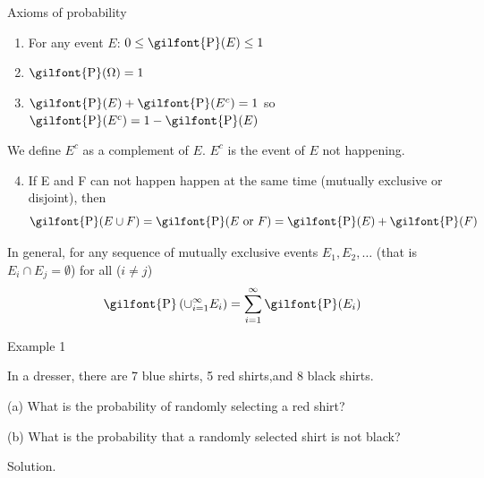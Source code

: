 \documentclass[
  ignorenonframetext,
]{beamer}
\providecommand{\tightlist}{%
  \setlength{\itemsep}{0pt}\setlength{\parskip}{0pt}}
\begin{document}
\begin{frame}{Axioms of probability}
\protect\hypertarget{axioms-of-probability}{}
\begin{enumerate}
\item
  For any event \(E\):
  \(0\leq \textrm{\gilfont{P}}\normalfont (E) \leq 1\)
\item
  \(\textrm{\gilfont{P}}\normalfont (\Omega)=1\)
\item
  \(\textrm{\gilfont{P}}\normalfont (E) + \textrm{\gilfont{P}}\normalfont (E^{c})=1\)
  so
  \(\textrm{\gilfont{P}}\normalfont (E^c)=1-\textrm{\gilfont{P}}\normalfont (E)\)
\end{enumerate}

We define \(E^{c}\) as a complement of \(E\). \(E^{c}\) is the event of
\(E\) not happening.

\begin{enumerate}
\setcounter{enumi}{3}
\tightlist
\item
  If E and F can not happen happen at the same time (mutually exclusive
  or disjoint), then
  \[\textrm{\gilfont{P}}\normalfont (E \cup F)=\textrm{\gilfont{P}}\normalfont (E \text{ or } F)=\textrm{\gilfont{P}}\normalfont (E) + \textrm{\gilfont{P}}\normalfont (F)\]
\end{enumerate}

In general, for any sequence of mutually exclusive events
\(E_1, E_2, \ldots\) (that is \(E_i \cap E_j = \emptyset\)) for all
(\(i\neq j\))
\[\textrm{\gilfont{P}}\normalfont \left(\cup_{i=1}^{\infty} E_i\right)=\sum_{i=1}^{\infty} \textrm{\gilfont{P}}\normalfont (E_i)\]
\end{frame}

\begin{frame}{Example 1}
\protect\hypertarget{example-1}{}
\begin{tcolorbox}

In a dresser, there are 7 blue shirts, 5 red shirts,and 8 black shirts.

(a) What is the probability of randomly selecting a red shirt?

(b) What is the probability that a randomly selected shirt is not black?

\end{tcolorbox}

\pause

\begin{tcolorbox}
Solution.

\vspace{30mm}

\end{tcolorbox}
\end{frame}
\end{document}
